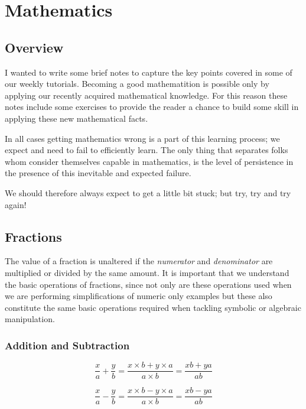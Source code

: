 \chapter{Mathematics}
\label{ch:intro}

\section{Overview}

I wanted to write some brief notes to capture the key points covered in some of our weekly tutorials. Becoming a good mathematition is possible only by applying our recently acquired mathematical knowledge. For this reason these notes include some exercises to provide the reader a chance to build some skill in applying these new mathematical facts. 

In all cases getting mathematics wrong is a part of this learning process; we expect and need to fail to efficiently learn. The only thing that separates folks whom consider themselves capable in mathematics, is the level of persistence in the presence of this inevitable and expected failure. 

We should therefore always expect to get a little bit stuck; but try, try and try again!

\section{Fractions}

The value of a fraction is unaltered if the \textit{numerator} and \textit{denominator} are multiplied or divided by the same amount. It is important that we understand the basic operations of fractions, since not only are these operations used when we are performing simplifications of numeric only examples but these also constitute the same basic operations required when tackling symbolic or algebraic manipulation.

\subsection{Addition and Subtraction}

\begin{equation}
 \frac{x}{a} + \frac{y}{b} = \frac{x \times b + y \times a}{a \times b} = \frac{xb + ya}{ab}
\end{equation}

\begin{equation}
 \frac{x}{a} - \frac{y}{b} = \frac{x \times b - y \times a}{a \times b} = \frac{xb - ya}{ab}
\end{equation}


